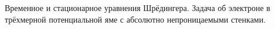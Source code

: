 \documentclass[__main__.tex]{subfiles}
\begin{document}
Временное и стационарное уравнения Шрёдингера. Задача об электроне в трёхмерной потенциальной яме с абсолютно непроницаемыми стенками.\\ 

\end{document}
